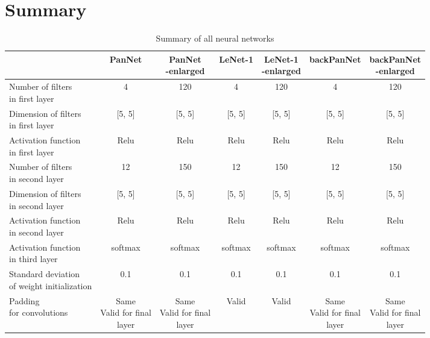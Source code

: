 \section{Summary}

\begin{table}
\centering
\caption{Summary of all neural networks}\label{tab:summary}
\begin{tabular}{l c c c c c c}
\toprule
& PanNet & \makecell{PanNet\\-enlarged}& LeNet-1 & \makecell{LeNet-1\\-enlarged}  & backPanNet & \makecell{backPanNet\\-enlarged}\\
\midrule
\makecell[l]{Number of filters\\in first layer} & 4 & 120 & 4 & 120 & 4 & 120\\
\makecell[l]{Dimension of filters\\in first layer}  & [5, 5] & [5, 5] & [5, 5] & [5, 5] & [5, 5] & [5, 5]\\
\makecell[l]{Activation function\\in first layer} & Relu & Relu & Relu & Relu & Relu & Relu\\
\makecell[l]{Number of filters\\in second layer} & 12 & 150 & 12 & 150 & 12 & 150\\
\makecell[l]{Dimension of filters\\in second layer}  & [5, 5] & [5, 5] & [5, 5] & [5, 5] & [5, 5] & [5, 5]\\
\makecell[l]{Activation function\\in second layer} & Relu & Relu & Relu & Relu & Relu & Relu\\
\makecell[l]{Activation function\\in third layer} & softmax & softmax & softmax & softmax & softmax & softmax\\
\makecell[l]{Standard deviation\\ of weight initialization} & 0.1 & 0.1 & 0.1 & 0.1 & 0.1 & 0.1\\
\makecell[l]{Padding\\for convolutions} & \makecell{Same\\Valid for final\\layer} & \makecell{Same\\Valid for final\\ layer} & Valid & Valid  & \makecell{Same\\Valid for final\\ layer} & \makecell{Same\\Valid for final\\ layer}\\

\end{tabular}
\end{table}
